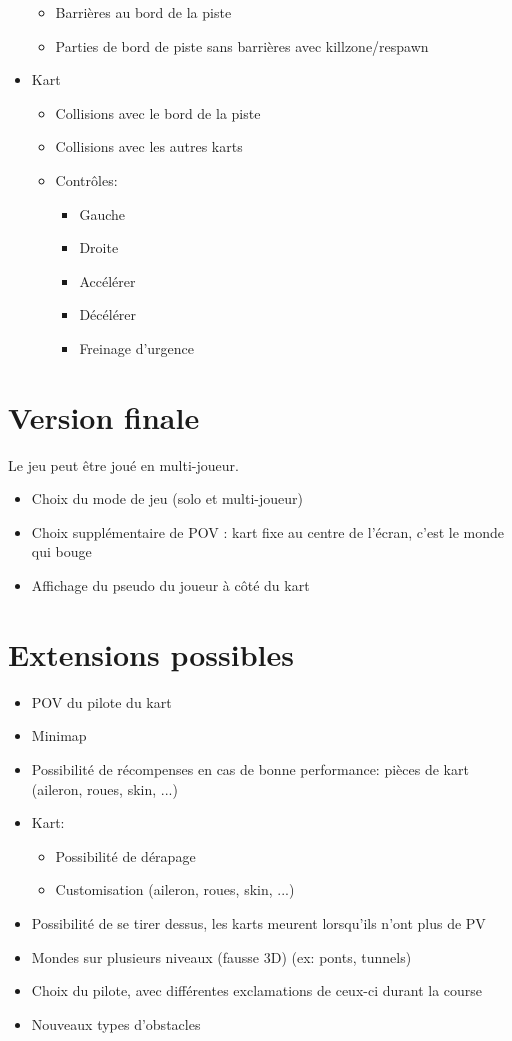 \documentclass{article}
\begin{document}
\begin{itemize}
\begin{itemize}
        \item Barrières au bord de la piste
        \item Parties de bord de piste sans barrières avec killzone/respawn
    \end{itemize}
    \item Kart \begin{itemize}
        \item Collisions avec le bord de la piste
        \item Collisions avec les autres karts
        \item Contrôles: \begin{itemize}
            \item Gauche
            \item Droite
            \item Accélérer
            \item Décélérer
            \item Freinage d'urgence
        \end{itemize}
    \end{itemize}
\end{itemize}

\section{Version finale}
Le jeu peut être joué en multi-joueur.
\begin{itemize}
    \item Choix du mode de jeu (solo et multi-joueur)
    \item Choix supplémentaire de POV : kart fixe au centre de l'écran, c'est le monde qui bouge
    \item Affichage du pseudo du joueur à côté du kart
\end{itemize}

\section{Extensions possibles}
\begin{itemize}
    \item POV du pilote du kart
    \item Minimap
    \item Possibilité de récompenses en cas de bonne performance: pièces de kart (aileron, roues, skin, ...)
    \item Kart: \begin{itemize}
        \item Possibilité de dérapage
        \item Customisation (aileron, roues, skin, ...)
    \end{itemize}
    \item Possibilité de se tirer dessus, les karts meurent lorsqu'ils n'ont plus de PV
    \item Mondes sur plusieurs niveaux (fausse 3D) (ex: ponts, tunnels)
    \item Choix du pilote, avec différentes exclamations de ceux-ci durant la course
    \item Nouveaux types d'obstacles
\end{itemize}
\end{document}
